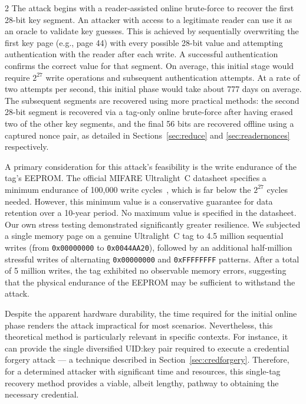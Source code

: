 \documentclass[10pt,letterpaper]{article}
\begin{document}
\begin{multicols}{2}
The attack begins with a reader-assisted online brute-force to recover the first 28-bit key segment. An attacker with access to a legitimate reader can use it as an oracle to validate key guesses. This is achieved by sequentially overwriting the first key page (e.g., page 44) with every possible 28-bit value and attempting authentication with the reader after each write. A successful authentication confirms the correct value for that segment. On average, this initial stage would require $2^{27}$ write operations and subsequent authentication attempts. At a rate of two attempts per second, this initial phase would take about 777 days on average. The subsequent segments are recovered using more practical methods: the second 28-bit segment is recovered via a tag-only online brute-force after having erased two of the other key segments, and the final 56 bits are recovered offline using a captured nonce pair, as detailed in Sections~\ref{sec:reduce} and \ref{sec:readernonces} respectively.

A primary consideration for this attack's feasibility is the write endurance of the tag's EEPROM. The official MIFARE Ultralight~C datasheet specifies a minimum endurance of 100,000 write cycles~\cite{mf0icu2_3r4_2024}, which is far below the $2^{27}$ cycles needed. However, this minimum value is a conservative guarantee for data retention over a 10-year period. No maximum value is specified in the datasheet. Our own stress testing demonstrated significantly greater resilience. We subjected a single memory page on a genuine Ultralight~C tag to 4.5 million sequential writes (from \texttt{0x00000000} to \texttt{0x0044AA20}), followed by an additional half-million stressful writes of alternating \texttt{0x00000000} and \texttt{0xFFFFFFFF} patterns. After a total of 5 million writes, the tag exhibited no observable memory errors, suggesting that the physical endurance of the EEPROM may be sufficient to withstand the attack.

Despite the apparent hardware durability, the time required for the initial online phase renders the attack impractical for most scenarios. Nevertheless, this theoretical method is particularly relevant in specific contexts. For instance, it can provide the single diversified UID:key pair required to execute a credential forgery attack --- a technique described in Section~\ref{sec:credforgery}. Therefore, for a determined attacker with significant time and resources, this single-tag recovery method provides a viable, albeit lengthy, pathway to obtaining the necessary credential.


\end{multicols}
\end{document}
